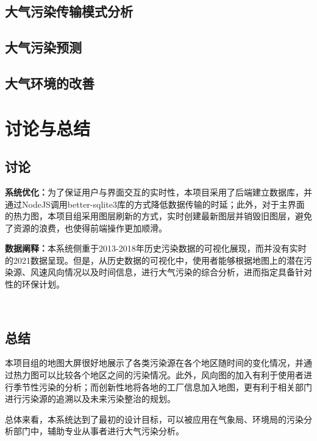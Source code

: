 \documentclass[UTF8]{ctexrep}
\begin{document}
    \subsection{大气污染传输模式分析}

    \subsection{大气污染预测}

    \subsection{大气环境的改善}

    \section{讨论与总结}
    \subsection{讨论}
    \textbf{系统优化：}为了保证用户与界面交互的实时性，本项目采用了后端建立数据库，并通过NodeJS调用better-sqlite3库的方式降低数据传输的时延；此外，对于主界面的热力图，本项目组采用图层刷新的方式，实时创建最新图层并销毁旧图层，避免了资源的浪费，也使得前端操作更加顺滑。
    
    \textbf{数据阐释：}本系统侧重于2013-2018年历史污染数据的可视化展现，而并没有实时的2021数据呈现。但是，从历史数据的可视化中，使用者能够根据地图上的潜在污染源、风速风向情况以及时间信息，进行大气污染的综合分析，进而指定具备针对性的环保计划。
     
    ~\\ 
    \subsection{总结}
    本项目组的地图大屏很好地展示了各类污染源在各个地区随时间的变化情况，并通过热力图可以比较各个地区之间的污染情况。此外，风向图的加入有利于使用者进行季节性污染的分析；而创新性地将各地的工厂信息加入地图，更有利于相关部门进行污染源的追溯以及未来污染整治的规划。
    
    总体来看，本系统达到了最初的设计目标，可以被应用在气象局、环境局的污染分析部门中，辅助专业从事者进行大气污染分析。
\end{document}
